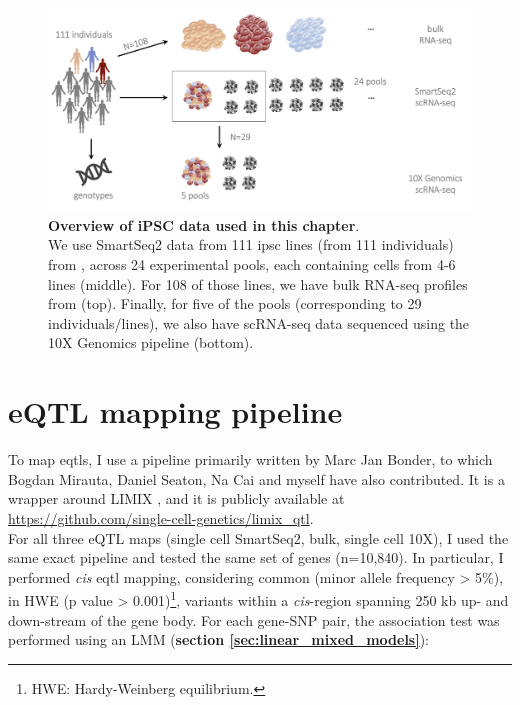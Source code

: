 \begin{figure}[h]
\centering
\includegraphics[width=14cm]{Chapter3/Fig/ips_data.png}
\caption[iPSC data]{\textbf{Overview of iPSC data used in this chapter}.\\
We use SmartSeq2 \cite{purcell2007plink} data from 111 \gls{ipsc} lines (from 111 individuals) from \cite{cuomo2020single}, across 24 experimental pools, each containing cells from 4-6 lines (middle).
For 108 of those lines, we have bulk RNA-seq profiles from \cite{mirauta2018population} (top).
Finally, for five of the pools (corresponding to 29 individuals/lines), we also have scRNA-seq data sequenced using the 10X Genomics pipeline \cite{zheng2017massively} (bottom).}
\label{fig:ipsc_data}
\end{figure}

\section{eQTL mapping pipeline}

To map \glspl{eqtl}, I use a pipeline primarily written by Marc Jan Bonder, to which Bogdan Mirauta, Daniel Seaton, Na Cai and myself have also contributed. 
It is a wrapper around LIMIX \cite{lippert2014limix, casale2015efficient}, and it is publicly available at \url{https://github.com/single-cell-genetics/limix_qtl}. \\

For all three eQTL maps (single cell SmartSeq2, bulk, single cell 10X), I used the same exact pipeline and tested the same set of genes (n=10,840).
In particular, I performed \textit{cis} \gls{eqtl} mapping, considering common (minor allele frequency > 5\%), in HWE (p value > 0.001)\footnote{HWE: Hardy-Weinberg equilibrium.}, variants within a \textit{cis}-region spanning 250 kb up- and down-stream of the gene body.
For each gene-SNP pair, the association test was performed using an LMM (\textbf{section
\ref{sec:linear_mixed_models}}):

